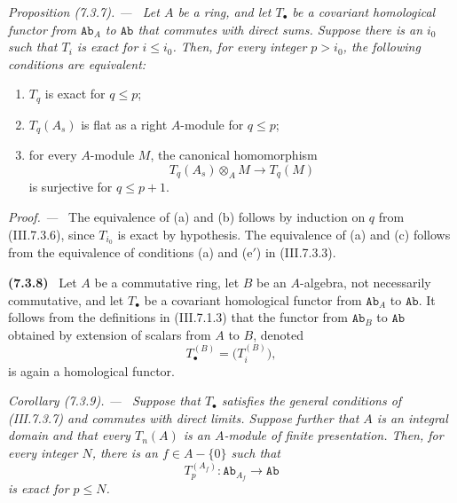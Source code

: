 \documentclass[10pt,oneside]{book}
\newcommand{\cat}[1]{\mathtt{#1}}
\newcommand{\sref}[2][]{(#2)}
\newcommand{\oldpage}[2][]{\setcounter{footnote}{0}\marginpar{\scriptsize\textbf{#1}~|~#2}\ignorespaces}
\newenvironment{env}[1][]{\par\medskip\noindent\textbf{(#1)}\ }{\par}
\newenvironment{proposition}[1][]{\par\medskip\noindent\itshape Proposition (#1). ---\ }{\par}
\newenvironment{corollary}[1][]{\par\medskip\noindent\itshape Corollary (#1). ---\ }{\par}
\newenvironment{proof}{\par\medskip\noindent\textit{Proof. ---\ }}{\par}
\begin{document}
\begin{proposition}[7.3.7]
\label{III.7.3.7}
Let $A$ be a ring, and let $T_\bullet$ be a covariant
homological functor from $\cat{Ab}_A$ to $\cat{Ab}$ that
commutes with direct sums.  Suppose there is an $i_0$ such that
$T_i$ is exact for $i\leq i_0$.  Then, for every integer
$p>i_0$, the following conditions are equivalent:
\begin{enumerate}
  \item[(a)] $T_q$ is exact for $q\leq p$;
  \item[(b)] $T_q(A_s)$ is flat as a right $A$-module for
    $q\leq p$;
  \item[(c)] for every $A$-module $M$, the canonical
    homomorphism
    \[
      T_q(A_s)\otimes_A M
      \longrightarrow
      T_q(M)
    \]
    is surjective for $q\leq p+1$.
\end{enumerate}
\end{proposition}

\begin{proof}
The equivalence of (a) and (b) follows by induction on $q$ from
\sref{III.7.3.6}, since $T_{i_0}$ is exact by hypothesis.  The
equivalence of (a) and (c) follows from the equivalence of
conditions (a) and ($\mathrm{e}'$) in \sref{III.7.3.3}.
\end{proof}

\oldpage[III]{184}

\begin{env}[7.3.8]
\label{III.7.3.8}
Let $A$ be a commutative ring, let $B$ be an $A$-algebra, not
necessarily commutative, and let $T_\bullet$ be a covariant
homological functor from $\cat{Ab}_A$ to $\cat{Ab}$.  It
follows from the definitions in \sref{III.7.1.3} that the
functor from $\cat{Ab}_B$ to $\cat{Ab}$ obtained by extension
of scalars from $A$ to $B$, denoted
\[
  T_\bullet^{(B)}=\bigl(T_i^{(B)}\bigr),
\]
is again a homological functor.
\end{env}

\begin{corollary}[7.3.9]
\label{III.7.3.9}
Suppose that $T_\bullet$ satisfies the general conditions of
\sref{III.7.3.7} and commutes with direct limits.  Suppose
further that $A$ is an integral domain and that every $T_n(A)$
is an $A$-module of finite presentation.  Then, for every
integer $N$, there is an $f\in A-\{0\}$ such that
\[
  T_p^{(A_f)}:\cat{Ab}_{A_f}\longrightarrow\cat{Ab}
\]
is exact for $p\leq N$.
\end{corollary}
\end{document}
